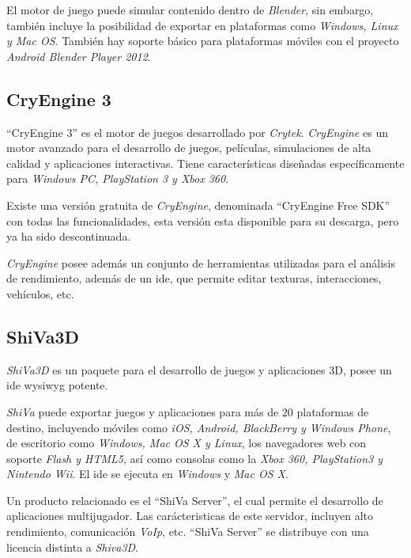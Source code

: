 El motor de juego puede simular contenido dentro de \textit{Blender}, sin
embargo, también incluye la posibilidad de exportar en plataformas como
\textit{Windows, Linux y Mac OS}. También hay soporte básico para plataformas
móviles con el proyecto \textit{Android Blender Player  2012}.

\subsection{CryEngine 3}


\enquote{CryEngine 3} es el motor de juegos desarrollado por \textit{Crytek}.
\textit{CryEngine} es un motor avanzado para el desarrollo de juegos, películas,
simulaciones de alta calidad y aplicaciones interactivas. Tiene características
diseñadas específicamente para \textit{Windows PC, PlayStation 3 y Xbox
    360}\cite{cryengine}.

Existe una versión gratuita de \textit{CryEngine}, denominada \enquote{CryEngine
    Free SDK} con todas las funcionalidades, esta versión esta disponible para
su descarga, pero ya ha sido descontinuada\cite{cryengine:sdk}.

\textit{CryEngine} posee además un conjunto de herramientas utilizadas para el
análisis de rendimiento\cite{cryengine}, además de un \Gls{ide}, que permite
editar texturas, interacciones, vehículos, etc.

\subsection{ShiVa3D}

\textit{ShiVa3D} es un paquete para el desarrollo de juegos y aplicaciones 3D,
posee un \Gls{ide} \Gls{wysiwyg} potente\cite{shiva}.

\textit{ShiVa} puede exportar juegos y aplicaciones para más de $20$ plataformas
de destino, incluyendo móviles como \textit{iOS, Android, BlackBerry y Windows
    Phone}, de escritorio como \textit{Windows, Mac OS X y Linux}, los
navegadores web con soporte \textit{Flash y HTML5}, así como consolas como la
\textit{Xbox 360, PlayStation3 y Nintendo Wii}. El \Gls{ide} se ejecuta en
\textit{Windows} y \textit{Mac OS X}\cite{shiva}. 

Un producto relacionado es el \enquote{ShiVa Server}, el cual permite el
desarrollo de aplicaciones multijugador. Las carácteristicas de este servidor,
incluyen alto rendimiento, comunicación \textit{VoIp}, etc. \enquote{ShiVa
    Server} se distribuye con una licencia distinta a
\textit{Shiva3D}\cite{shiva}.

